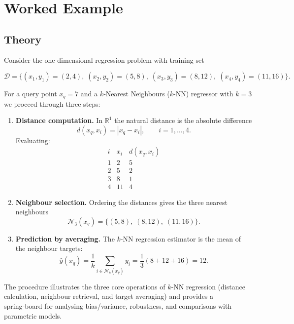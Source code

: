 \documentclass[12pt, a4paper]{article}
\begin{document}
\newpage

\section{Worked Example}
\label{sec:worked-example}

\subsection{Theory}
Consider the one‑dimensional regression problem with training set  

\[
\mathcal{D}= \{ (x_{1},y_{1})=(2,4),\; (x_{2},y_{2})=(5,8),\; (x_{3},y_{3})=(8,12),\; (x_{4},y_{4})=(11,16) \}.
\]

For a query point \(x_{q}=7\) and a $k$‑Nearest Neighbours (\(k\)-NN) regressor with \(k=3\) we proceed through three steps:

\begin{enumerate}
  \item \textbf{Distance computation.}  
  In \(\mathbb{R}^{1}\) the natural distance is the absolute difference  
  \[
  d(x_{q},x_{i}) = |x_{q}-x_{i}|,\qquad i=1,\dots,4 .
  \]
  Evaluating:
  \[
  \begin{array}{c|c|c}
  i & x_i & d(x_{q},x_i) \\ \hline
  1 & 2  & 5 \\[2pt]
  2 & 5  & 2 \\[2pt]
  3 & 8  & 1 \\[2pt]
  4 & 11 & 4 
  \end{array}
  \]

  \item \textbf{Neighbour selection.}  
  Ordering the distances gives the three nearest neighbours  
  \[
  \mathcal{N}_{3}(x_{q})=\{(5,8),\;(8,12),\;(11,16)\}.
  \]

  \item \textbf{Prediction by averaging.}  
  The $k$‑NN regression estimator is the mean of the neighbour targets:
  \[
  \hat{y}(x_{q})=\frac{1}{k}\sum_{i\in\mathcal{N}_{k}(x_{q})}y_{i}
                =\frac{1}{3}(8+12+16)=12 .
  \]
\end{enumerate}

The procedure illustrates the three core operations of $k$‑NN regression
(distance calculation, neighbour retrieval, and target averaging) and
provides a spring‑board for analysing bias/variance, robustness, and
comparisons with parametric models.
\end{document}
